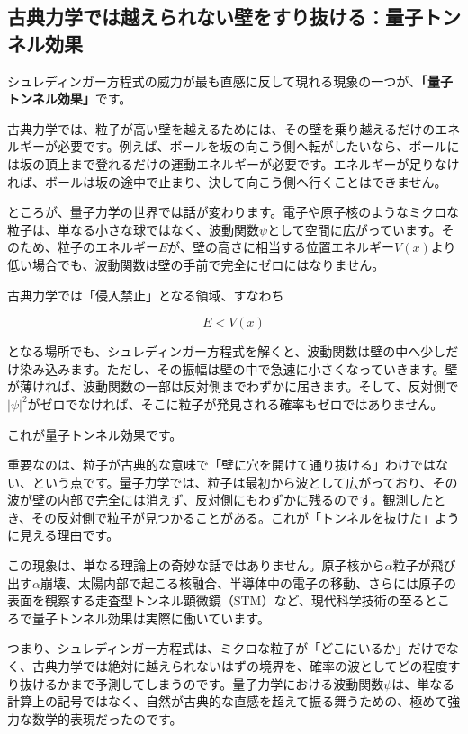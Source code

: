\subsection{古典力学では越えられない壁をすり抜ける：量子トンネル効果}

シュレディンガー方程式の威力が最も直感に反して現れる現象の一つが、\textbf{「量子トンネル効果」}です。

古典力学では、粒子が高い壁を越えるためには、その壁を乗り越えるだけのエネルギーが必要です。例えば、ボールを坂の向こう側へ転がしたいなら、ボールには坂の頂上まで登れるだけの運動エネルギーが必要です。エネルギーが足りなければ、ボールは坂の途中で止まり、決して向こう側へ行くことはできません。

ところが、量子力学の世界では話が変わります。電子や原子核のようなミクロな粒子は、単なる小さな球ではなく、波動関数\(\psi\)として空間に広がっています。そのため、粒子のエネルギー\(E\)が、壁の高さに相当する位置エネルギー\(V(x)\)より低い場合でも、波動関数は壁の手前で完全にゼロにはなりません。

古典力学では「侵入禁止」となる領域、すなわち

\[
E < V(x)
\]

となる場所でも、シュレディンガー方程式を解くと、波動関数は壁の中へ少しだけ染み込みます。ただし、その振幅は壁の中で急速に小さくなっていきます。壁が薄ければ、波動関数の一部は反対側までわずかに届きます。そして、反対側で\(|\psi|^2\)がゼロでなければ、そこに粒子が発見される確率もゼロではありません。

これが量子トンネル効果です。

重要なのは、粒子が古典的な意味で「壁に穴を開けて通り抜ける」わけではない、という点です。量子力学では、粒子は最初から波として広がっており、その波が壁の内部で完全には消えず、反対側にもわずかに残るのです。観測したとき、その反対側で粒子が見つかることがある。これが「トンネルを抜けた」ように見える理由です。

この現象は、単なる理論上の奇妙な話ではありません。原子核から\(\alpha\)粒子が飛び出す\(\alpha\)崩壊、太陽内部で起こる核融合、半導体中の電子の移動、さらには原子の表面を観察する走査型トンネル顕微鏡（STM）など、現代科学技術の至るところで量子トンネル効果は実際に働いています。

つまり、シュレディンガー方程式は、ミクロな粒子が「どこにいるか」だけでなく、古典力学では絶対に越えられないはずの境界を、確率の波としてどの程度すり抜けるかまで予測してしまうのです。量子力学における波動関数\(\psi\)は、単なる計算上の記号ではなく、自然が古典的な直感を超えて振る舞うための、極めて強力な数学的表現だったのです。


